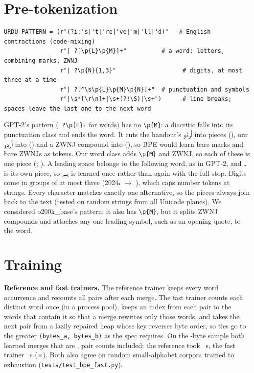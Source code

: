 \documentclass[10pt]{article}
\newcommand{\ur}[1]{\foreignlanguage{urdu}{#1}}
\newcommand{\tablefont}{\footnotesize}
\begin{document}
\begin{table}[!htb]\centering\tablefont

\caption{Normalization rules and the occurrences each changed in the audit samples.}\label{tab:norm}
\end{table}

\section{Pre-tokenization}
\begin{small}
\begin{verbatim}
URDU_PATTERN = (r"(?i:'s|'t|'re|'ve|'m|'ll|'d)"   # English contractions (code-mixing)
                r"| ?[\p{L}\p{M}‌]+"          # a word: letters, combining marks, ZWNJ
                r"| ?\p{N}{1,3}"                   # digits, at most three at a time
                r"| ?[^\s\p{L}\p{M}\p{N}‌]+"  # punctuation and symbols
                r"|\s*[\r\n]+|\s+(?!\S)|\s+")      # line breaks; spaces leave the last one to the next word
\end{verbatim}
\end{small}
GPT-2's pattern (\verb/ ?\p{L}+/ for words) has no \verb/\p{M}/: a diacritic falls into its punctuation class
and ends the word. It cuts the handout's \ur{اُردُو} into \GptCountHandout{} pieces (\GptPiecesHandout), our
\ur{اُردو} into \GptCountPlain{} (\GptPiecesPlain) and a ZWNJ compound into \GptCountZwnj{}
(\GptPiecesZwnj), so BPE would learn bare marks and bare ZWNJs as tokens. Our word class adds \verb/\p{M}/
and ZWNJ, so each of these is one piece (\OurPiecesHandout; \OurPiecesZwnj). A leading space belongs to the
following word, as in GPT-2, and \ur{۔} is its own piece, so \ur{ہے} is learned once rather than again with
the full stop. Digits come in groups of at most three (2024\ur{ء} $\to$ \OurPiecesYear), which caps number
tokens at \NumberPieces{} strings. Every character matches exactly one alternative, so the pieces always join
back to the text (tested on random strings from all Unicode planes). We considered o200k\_base's pattern: it
also has \verb/\p{M}/, but it splits ZWNJ compounds and attaches any one leading symbol, such as an opening
quote, to the word.

\section{Training}
\textbf{Reference and fast trainers.} The reference trainer keeps every word occurrence and recounts all pairs
after each merge. The fast trainer counts each distinct word once (in a process pool), keeps an index from each
pair to the words that contain it so that a merge rewrites only those words, and takes the next pair from a
lazily repaired heap whose key reverses byte order, so ties go to the greater \texttt{(bytes\_a, bytes\_b)} as
the spec requires. On the \RefSampleBytes-byte sample both learned \EqMerges{} merges that are \EqVerdict,
pair counts included: the reference took \RefSeconds~s, the fast trainer \FastSeconds~s (\Speedup$\times$).
Both also agree on random small-alphabet corpora trained to exhaustion (\texttt{tests/test\_bpe\_fast.py}).
\end{document}
